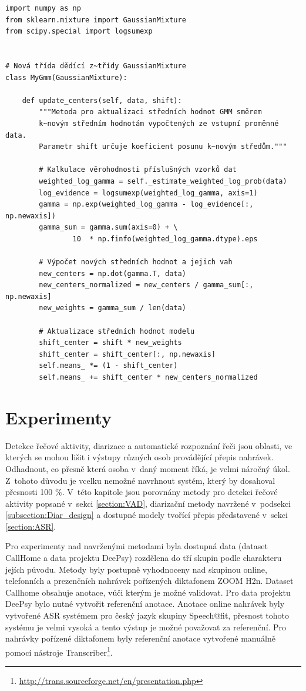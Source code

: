 \begin{verbatim}
import numpy as np
from sklearn.mixture import GaussianMixture
from scipy.special import logsumexp


# Nová třída dědící z~třídy GaussianMixture
class MyGmm(GaussianMixture):

    def update_centers(self, data, shift):
        """Metoda pro aktualizaci středních hodnot GMM směrem 
        k~novým středním hodnotám vypočtených ze vstupní proměnné data. 
        Parametr shift určuje koeficient posunu k~novým středům."""

        # Kalkulace věrohodnosti příslušných vzorků dat 
        weighted_log_gamma = self._estimate_weighted_log_prob(data)
        log_evidence = logsumexp(weighted_log_gamma, axis=1)
        gamma = np.exp(weighted_log_gamma - log_evidence[:, np.newaxis])
        gamma_sum = gamma.sum(axis=0) + \ 
                10  * np.finfo(weighted_log_gamma.dtype).eps

        # Výpočet nových středních hodnot a jejich vah
        new_centers = np.dot(gamma.T, data)
        new_centers_normalized = new_centers / gamma_sum[:, np.newaxis]
        new_weights = gamma_sum / len(data)

        # Aktualizace středních hodnot modelu
        shift_center = shift * new_weights
        shift_center = shift_center[:, np.newaxis]
        self.means_ *= (1 - shift_center)
        self.means_ += shift_center * new_centers_normalized
\end{verbatim}


\chapter{Experimenty}
\label{chap:Evaluation}
Detekce řečové aktivity, diarizace a automatické rozpoznání řeči jsou oblasti, ve kterých se mohou lišit i výstupy různých osob provádějící přepis nahrávek. Odhadnout, co přesně která osoba v~daný moment říká, je velmi náročný úkol. Z~tohoto důvodu je vcelku nemožné navrhnout systém, který by dosahoval přesnosti 100 \%. V~této kapitole jsou porovnány metody pro detekci řečové aktivity popsané v~sekci \ref{section:VAD}, diarizační metody navržené v~podsekci \ref{subsection:Diar_design} a dostupné modely tvořící přepis představené v~sekci \ref{section:ASR}.

Pro experimenty nad navrženými metodami byla dostupná data (dataset CallHome a data projektu DeePsy) rozdělena do tří skupin podle charakteru jejích původu. Metody byly postupně vyhodnoceny nad skupinou online, telefonních a prezenčních nahrávek pořízených diktafonem ZOOM H2n. Dataset Callhome obsahuje anotace, vůči kterým je možné validovat. Pro data projektu DeePsy bylo nutné vytvořit referenční anotace. Anotace online nahrávek byly vytvořené ASR systémem pro český jazyk skupiny Speech@fit, přesnost tohoto systému je velmi vysoká a tento výstup je možné považovat za referenční. Pro nahrávky pořízené diktafonem byly referenční anotace vytvořené manuálně pomocí nástroje Transcriber\footnote{\url{http://trans.sourceforge.net/en/presentation.php}}.

